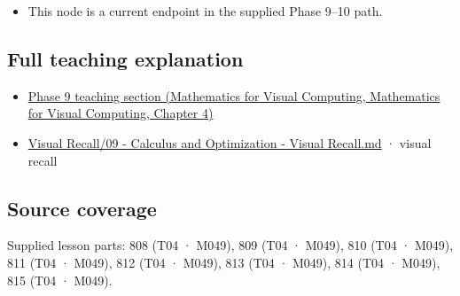 \begin{itemize}
\tightlist
\item
  This node is a current endpoint in the supplied Phase 9--10 path.
\end{itemize}

\subsection{Full teaching explanation}\label{appendix-d9f70bdfbc92-full-teaching-explanation}

\begin{itemize}
\tightlist
\item
  \href{../02-Mathematics-for-Visual-Computing/main.pdf\#nameddest=01-foundations-i-ch020-functions-limits-continuity-and-scalar-change}{Phase 9 teaching section (Mathematics for Visual Computing, Mathematics for Visual Computing, Chapter 4)}
\item
  \hyperref[appendix-adf48f5dc5c1]{Visual Recall/09 - Calculus and Optimization - Visual Recall.md} · visual recall
\end{itemize}

\subsection{Source coverage}\label{appendix-d9f70bdfbc92-source-coverage}

Supplied lesson parts: 808 (T04 · M049), 809 (T04 · M049), 810 (T04 · M049), 811 (T04 · M049), 812 (T04 · M049), 813 (T04 · M049), 814 (T04 · M049), 815 (T04 · M049).
